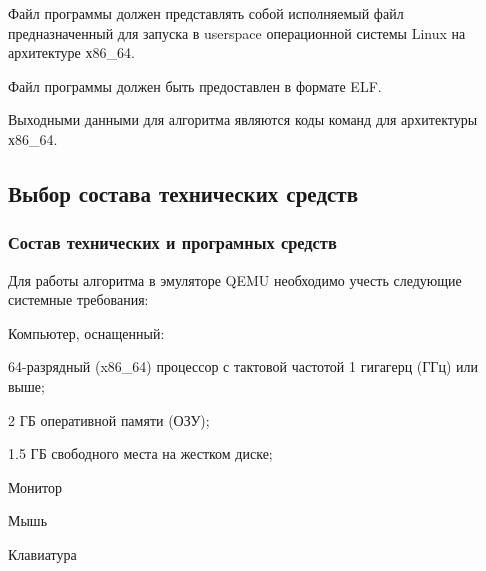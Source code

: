 \begin{my_enumerate}
\item Файл программы должен представлять собой исполняемый файл предназначенный для запуска в userspace операционной системы Linux на архитектуре х86\_64.
\item Файл программы должен быть предоставлен в формате ELF.
\end{my_enumerate}

\medskip
Выходными данными для алгоритма являются коды команд для архитектуры х86\_64.



\subsection{Выбор состава технических средств}

\subsubsection{Состав технических и програмных средств}

Для работы алгоритма в эмуляторе QEMU необходимо учесть следующие системные требования:
\begin{my_enumerate}
\item Компьютер, оснащенный:
    \begin{my_enumerate}
    \item 64-разрядный (x86\_64) процессор с тактовой частотой 1 гигагерц (ГГц) или выше;
    \item 2 ГБ оперативной памяти (ОЗУ);
    \item 1.5 ГБ свободного места на жестком диске;
    \end{my_enumerate}
\item Монитор
\item Мышь
\item Клавиатура
\end{my_enumerate}
